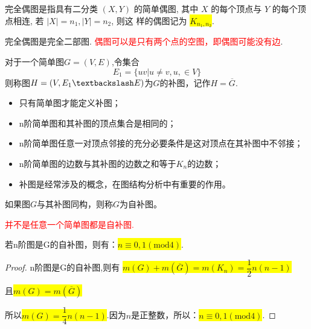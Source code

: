 \begin{definition}[完全偶图]
完全偶图是指具有二分类 \( ({X}, {Y}) \) 的简单偶图, 其中 \( {X} \) 的每个顶点与 \( {Y} \) 的每个顶点相连, 若 \( |X|=n_{1},|Y|=n_{2} \), 则这 样的偶图记为 \colorbox{yellow}{\( K_{n_1, n_2} \)}.
\end{definition}

\begin{note}
	完全偶图是完全二部图. \textcolor{red}{偶图可以是只有两个点的空图，即偶图可能没有边}.
\end{note}

\noindent {\bfseries \textcolor{ecolor}{简单图的补图：}}
\begin{definition}[补图]
	对于一个简单图$G=(V,E)$,令集合
	\[
	E_1=\{uv|u\ne v, u, \in V  \}
	\]
	则称图$H=(V,E_1\textbackslash E)$为$G$的补图，记作$H=\overline{G}.$
\end{definition}
\begin{note}
	\begin{itemize}
		\item 只有简单图才能定义补图；
		\item n阶简单图和其补图的顶点集合是相同的；
		\item n阶简单图任意一对顶点邻接的充分必要条件是这对顶点在其补图中不邻接；
		\item n阶简单图的边数与其补图的边数之和等于$K_n$的边数；
		\item 补图是经常涉及的概念，在图结构分析中有重要的作用。	
	\end{itemize}
\end{note}

\begin{definition}[自补图]
	如果图$G$与其补图同构，则称$G$为自补图。
\end{definition}
\begin{note}
	\textcolor{red}{并不是任意一个简单图都是自补图.}
\end{note}


\begin{theorem}
	若n阶图是G的自补图，则有：\colorbox{yellow}{$n\equiv 0, 1(\mathrm{mod 4})$}.
\end{theorem}
\begin{proof}
	n阶图是G的自补图,则有
	\colorbox{yellow}{$m(G) +m(\overline{G}) = m(K_n) = \dfrac{1}{2}n(n-1)$}
	
	且\colorbox{yellow}{$m(G) =m(\overline{G})$}
	
	所以\colorbox{yellow}{$m(G) = \dfrac{1}{4}n(n-1)$}.因为$n$是正整数，所以：\colorbox{yellow}{$n\equiv 0, 1(\mathrm{mod 4})$}.
\end{proof}

